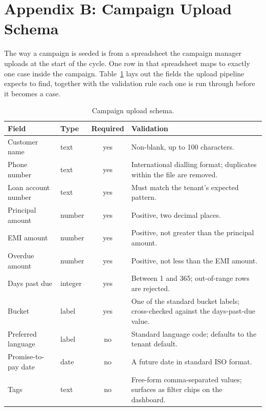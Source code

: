 \chapter*{Appendix B: Campaign Upload Schema}

The way a campaign is seeded is from a spreadsheet the campaign manager uploads at the start of the cycle. One row in that spreadsheet maps to exactly one case inside the campaign. Table~\ref{tab:csv-schema} lays out the fields the upload pipeline expects to find, together with the validation rule each one is run through before it becomes a case.

\begin{table}[H]
\centering
\caption{Campaign upload schema.}
\label{tab:csv-schema}
\begin{tabularx}{\textwidth}{l l c X}
\toprule
\textbf{Field} & \textbf{Type} & \textbf{Required} & \textbf{Validation} \\
\midrule
Customer name      & text    & yes & Non-blank, up to 100 characters. \\
Phone number       & text    & yes & International dialling format; duplicates within the file are removed. \\
Loan account number & text   & yes & Must match the tenant's expected pattern. \\
Principal amount   & number  & yes & Positive, two decimal places. \\
EMI amount         & number  & yes & Positive, not greater than the principal amount. \\
Overdue amount     & number  & yes & Positive, not less than the EMI amount. \\
Days past due      & integer & yes & Between 1 and 365; out-of-range rows are rejected. \\
Bucket             & label   & yes & One of the standard bucket labels; cross-checked against the days-past-due value. \\
Preferred language & label   & no  & Standard language code; defaults to the tenant default. \\
Promise-to-pay date & date   & no  & A future date in standard ISO format. \\
Tags               & text    & no  & Free-form comma-separated values; surfaces as filter chips on the dashboard. \\
\bottomrule
\end{tabularx}
\end{table}

